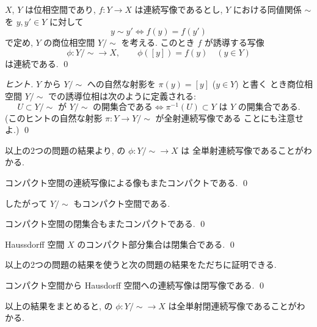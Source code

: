 \documentclass[12pt,twoside]{jarticle}
\begin{document}
\begin{question}
  $X$, $Y$ は位相空間であり, $f:Y\to X$ は連続写像であるとし,
  $Y$ における同値関係 $\sim$ を $y,y'\in Y$ に対して
  \begin{equation*}
    y\sim y' \iff f(y) = f(y')
  \end{equation*}
  で定め, $Y$ の商位相空間 $Y/{\sim}$ を考える.
  このとき $f$ が誘導する写像
  \begin{equation*}
  \phi: Y/{\sim} \to X, \qquad 
  \phi([y])=f(y)\quad (y\in Y)   
  \end{equation*}
  は連続である.
  \qed
\end{question}

\begin{proof}[ヒント]
  $Y$ から $Y/{\sim}$ への自然な射影を $\pi(y)=[y]$ ($y\in Y$) と書く
  とき商位相空間 $Y/{\sim}$ での誘導位相は次のように定義される:
  \begin{equation*}
    \text{$U\subset Y/{\sim}$ が $Y/{\sim}$ の開集合である}
    \iff
    \text{$\pi^{-1}(U)\subset Y$ は $Y$ の開集合である}.
  \end{equation*}
  (このヒントの自然な射影 $\pi:Y\to Y/{\sim}$ が全射連続写像である
  ことにも注意せよ.)
  \qed
\end{proof}

以上の2つの問題の結果より, 
の $\phi:Y/{\sim}\to X$ は
全単射連続写像であることがわかる.

\begin{question}
  コンパクト空間の連続写像による像もまたコンパクトである.
  \qed
\end{question}

したがって $Y/{\sim}$ もコンパクト空間である.

\begin{question}
  コンパクト空間の閉集合もまたコンパクトである. \qed
\end{question}

\begin{question}
  Haussdorff 空間 $X$ のコンパクト部分集合は閉集合である.
  \qed
\end{question}

以上の2つの問題の結果を使うと次の問題の結果をただちに証明できる.

\begin{question}
  コンパクト空間から Hausdorff 空間への連続写像は閉写像である.
  \qed
\end{question}

以上の結果をまとめると, の $\phi:Y/{\sim}\to X$ 
は全単射閉連続写像であることがわかる.
\end{document}
